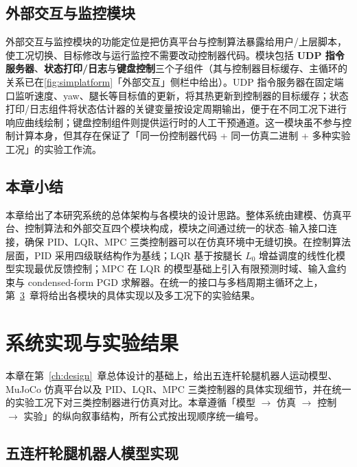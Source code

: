 \documentclass{smbuthesis}
\begin{document}
\section{外部交互与监控模块}

外部交互与监控模块的功能定位是把仿真平台与控制算法暴露给用户/上层脚本，使工况切换、目标修改与运行监控不需要改动控制器代码。模块包括 \textbf{UDP 指令服务器}、\textbf{状态打印/日志}与\textbf{键盘控制}三个子组件（其与控制器目标缓存、主循环的关系已在\cref{fig:simplatform}「外部交互」侧栏中给出）。UDP 指令服务器在固定端口监听速度、yaw、腿长等目标值的更新，将其热更新到控制器的目标缓存；状态打印/日志组件将状态估计器的关键变量按设定周期输出，便于在不同工况下进行响应曲线绘制；键盘控制组件则提供运行时的人工干预通道。这一模块虽不参与控制计算本身，但其存在保证了「同一份控制器代码 + 同一仿真二进制 + 多种实验工况」的实验工作流。

\section{本章小结}

本章给出了本研究系统的总体架构与各模块的设计思路。整体系统由建模、仿真平台、控制算法和外部交互四个模块构成，模块之间通过统一的状态--输入接口连接，确保 PID、LQR、MPC 三类控制器可以在仿真环境中无缝切换。在控制算法层面，PID 采用四级联结构作为基线；LQR 基于按腿长 $L_0$ 增益调度的线性化模型实现最优反馈控制；MPC 在 LQR 的模型基础上引入有限预测时域、输入盒约束与 condensed-form PGD 求解器。在统一的接口与多档周期主循环之上，第~\ref{ch:impl}~章将给出各模块的具体实现以及多工况下的实验结果。

\chapter{系统实现与实验结果}\label{ch:impl}

本章在第~\ref{ch:design}~章总体设计的基础上，给出五连杆轮腿机器人运动模型、MuJoCo 仿真平台以及 PID、LQR、MPC 三类控制器的具体实现细节，并在统一的实验工况下对三类控制器进行仿真对比。本章遵循「模型 $\to$ 仿真 $\to$ 控制 $\to$ 实验」的纵向叙事结构，所有公式按出现顺序统一编号。

\section{五连杆轮腿机器人模型实现}
\end{document}
